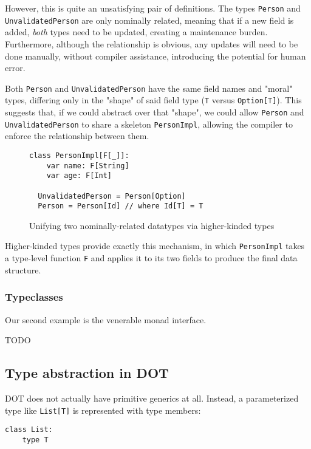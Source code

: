 \documentclass[acmsmall,screen]{acmart}
\begin{document}
However, this is quite an unsatisfying pair of definitions. The types
\texttt{Person} and \texttt{UnvalidatedPerson} are only nominally related,
meaning that if a new field is added, \emph{both} types need to be updated,
creating a maintenance burden. Furthermore, although the relationship is
obvious, any updates will need to be done manually, without compiler
assistance, introducing the potential for human error.

Both \texttt{Person} and \texttt{UnvalidatedPerson} have the same field
names and "moral" types, differing only in the "shape" of said field type
(\texttt{T} versus \texttt{Option[T]}). This suggests that, if we could
abstract over that "shape", we could allow \texttt{Person} and
\texttt{UnvalidatedPerson} to share a skeleton \texttt{PersonImpl},
allowing the compiler to enforce the relationship between them.

\begin{figure}[ht]
  \begin{lstlisting}[style=scala]
  class PersonImpl[F[_]]:
    var name: F[String]
    var age: F[Int]

  UnvalidatedPerson = Person[Option]
  Person = Person[Id] // where Id[T] = T
  \end{lstlisting}
  \caption{Unifying two nominally-related datatypes via higher-kinded
  types}
\end{figure}

Higher-kinded types provide exactly this mechanism, in which
\texttt{PersonImpl} takes a type-level function \texttt{F} and applies it to
its two fields to produce the final data structure.

\subsubsection{Typeclasses}

Our second example is the venerable monad interface.

TODO

\subsection{Type abstraction in DOT}

DOT does not actually have primitive generics at all. Instead, a parameterized
type like \texttt{List[T]} is represented with type members:
\begin{lstlisting}[style=scala]
  class List:
    type T
\end{lstlisting}
\end{document}
